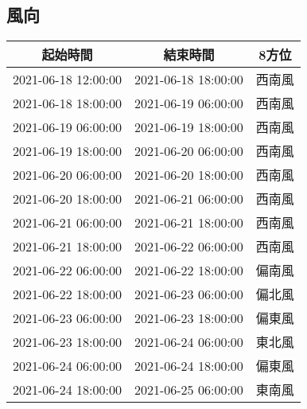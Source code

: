 \documentclass{article}%
\begin{document}
\begin{center}
\section{風向}%
\label{sec:}%
\begin{tabular}{|c|c|c|}%
\hline%
起始時間&結束時間&8方位\\%
\hline%
2021{-}06{-}18 12:00:00&2021{-}06{-}18 18:00:00&西南風\\%
\hline%
2021{-}06{-}18 18:00:00&2021{-}06{-}19 06:00:00&西南風\\%
\hline%
2021{-}06{-}19 06:00:00&2021{-}06{-}19 18:00:00&西南風\\%
\hline%
2021{-}06{-}19 18:00:00&2021{-}06{-}20 06:00:00&西南風\\%
\hline%
2021{-}06{-}20 06:00:00&2021{-}06{-}20 18:00:00&西南風\\%
\hline%
2021{-}06{-}20 18:00:00&2021{-}06{-}21 06:00:00&西南風\\%
\hline%
2021{-}06{-}21 06:00:00&2021{-}06{-}21 18:00:00&西南風\\%
\hline%
2021{-}06{-}21 18:00:00&2021{-}06{-}22 06:00:00&西南風\\%
\hline%
2021{-}06{-}22 06:00:00&2021{-}06{-}22 18:00:00&偏南風\\%
\hline%
2021{-}06{-}22 18:00:00&2021{-}06{-}23 06:00:00&偏北風\\%
\hline%
2021{-}06{-}23 06:00:00&2021{-}06{-}23 18:00:00&偏東風\\%
\hline%
2021{-}06{-}23 18:00:00&2021{-}06{-}24 06:00:00&東北風\\%
\hline%
2021{-}06{-}24 06:00:00&2021{-}06{-}24 18:00:00&偏東風\\%
\hline%
2021{-}06{-}24 18:00:00&2021{-}06{-}25 06:00:00&東南風\\%
\hline%
\end{tabular}

%

\end{center}
\end{document}
